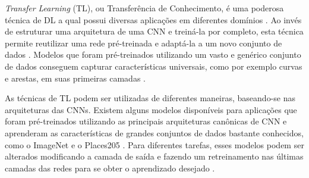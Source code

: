 \emph{Transfer Learning} (TL), ou Transferência de Conhecimento, é uma poderosa técnica de DL a qual possui diversas aplicações em diferentes domínios \cite{ref:gulli}. Ao invés de estruturar uma arquitetura de uma CNN e treiná-la por completo, esta técnica permite reutilizar uma rede pré-treinada e adaptá-la a um novo conjunto de dados \cite{ref:sewak}. Modelos que foram pré-treinados utilizando um vasto e genérico conjunto de dados conseguem capturar características universais, como por exemplo curvas e arestas, em suas primeiras camadas \cite{ref:zaccone}.

As técnicas de TL podem ser utilizadas de diferentes maneiras, baseando-se nas arquiteturas das CNNs. Existem alguns modelos disponíveis para aplicações que foram pré-treinados utilizando as principais arquiteturas canônicas de CNN e aprenderam as características de grandes conjuntos de dados bastante conhecidos, como o ImageNet e o Places205 \cite{ref:image-net,ref:places205}. Para diferentes tarefas, esses modelos podem ser alterados modificando a camada de saída e fazendo um retreinamento nas últimas camadas das redes para se obter o aprendizado desejado \cite{ref:khan}. 